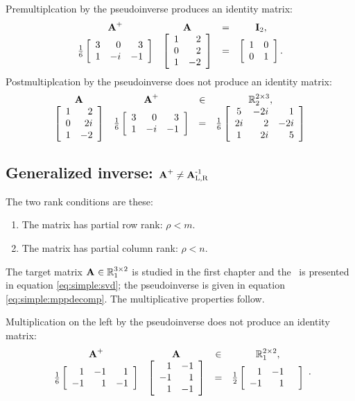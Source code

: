 Premultiplcation by the pseudoinverse produces an identity matrix:
\begin{equation*}
  \begin{array}{cccc}
  \Ap&\A{}&=&\I{2},\\
  \frac{1}{6}\left[
\begin{array}{crr}
 3 &  0 & 3 \\
 1 & -i & -1
\end{array}
\right] &
  \mat{rr}{1&2\\0&2\\1&-2} & = &
  \itwo.
  \end{array}
\end{equation*}
Postmultiplcation by the pseudoinverse does not produce an identity matrix:
\begin{equation*}
  \begin{array}{cccc}
  \A{}&\Ap&\in&\real{\by{2}{3}}_{2},\\
  \mat{rr}{1&2\\0&2i\\1&-2} &
  \frac{1}{6}\left[
\begin{array}{crr}
 3 &  0 & 3 \\
 1 & -i & -1
\end{array}
\right]
   & = &
  \frac{1}{6}
\left[
\begin{array}{crr}
 5 & -2 i & 1 \\
 2 i & 2 & -2 i \\
 1 & 2 i & 5
\end{array}
\right]
  \end{array}
\end{equation*}

\subsection{Generalized inverse: $\Ap\ne\AinvB$}
The two rank conditions are these:
\begin{enumerate}
\item The matrix has partial row rank: $\rho < m$.
\item The matrix has partial column rank: $\rho < n$.
\end{enumerate}

The target matrix $\A{}\in\real{\by{3}{2}}_{1}$ is studied in the first chapter and the \svdl \ is presented in equation \eqref{eq:simple:svd}; the pseudoinverse is given in equation \eqref{eq:simple:mppdecomp}. The multiplicative properties follow.

Multiplication on the left by the pseudoinverse does not produce an identity matrix:
\begin{equation*}
  \begin{array}{cccc}
  \Ap&\A{}&\in&\real{\by{2}{2}}_{1},\\
  \frac{1}{6}\mat{rrr}{1&-1&1\\-1&1&-1} &
  \Aexample 
   & = &
  \frac{1}{2}
  \mat{rrr}{1&-1&\\-1&1}
  \end{array}.
\end{equation*}

